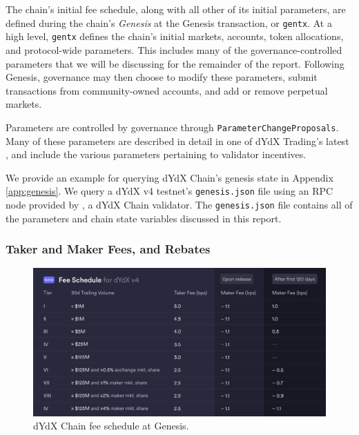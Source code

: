             The chain's initial fee schedule, along with all other of its initial parameters, are defined during the chain's \textit{Genesis} at the Genesis transaction, or \texttt{gentx}. At a high level, \texttt{gentx} defines the chain's initial markets, accounts, token allocations, and protocol-wide parameters. This includes many of the governance-controlled parameters that we will be discussing for the remainder of the report. Following Genesis, governance may then choose to modify these parameters, submit transactions from community-owned accounts, and add or remove perpetual markets. 

            Parameters are controlled by governance through \texttt{ParameterChangeProposals}. Many of these parameters are described in detail in one of dYdX Trading's latest , and include the various parameters pertaining to validator incentives. 

            We provide an example for querying dYdX Chain's genesis state in Appendix \ref{app:genesis}. We query a dYdX v4 testnet's  \texttt{genesis.json} file using an RPC node provided by , a dYdX Chain validator. The \texttt{genesis.json} file contains all of the parameters and chain state variables discussed in this report.

        \subsubsection{Taker and Maker Fees, and Rebates}

            \begin{figure}[htp]
                \centering
                \includegraphics[width=0.7\linewidth]{figs/fees_schedule.png}
                \caption{dYdX Chain fee schedule at Genesis.}
                \label{fig:schedule}
            \end{figure}

